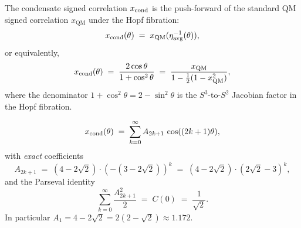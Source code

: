 \begin{theorem}
\label{P9:thm:hopf_pushforward}
The condensate signed correlation $x_{\mathrm{cond}}$ is the push-forward of the
standard QM signed correlation $x_\mathrm{QM}$ under the Hopf fibration:
\begin{equation}
  x_{\mathrm{cond}}(\theta) \;=\; x_\mathrm{QM}(\eta^{-1}_\mathrm{avg}(\theta)),
  \label{P9:eq:hopf_pushforward}
\end{equation}
or equivalently,
\begin{equation}
  x_{\mathrm{cond}}(\theta) \;=\; \frac{2\cos\theta}{1+\cos^2\theta}
  \;=\; \frac{x_\mathrm{QM}}{1 - \tfrac{1}{2}(1-x_\mathrm{QM}^2)},
  \label{P9:eq:xcond_from_xQM}
\end{equation}
where the denominator $1+\cos^2\theta = 2-\sin^2\theta$ is the
$S^3$-to-$S^2$ Jacobian factor in the Hopf fibration.
\end{theorem}

\begin{theorem}
\label{P9:thm:fourier_exact}
\begin{equation}
  x_{\mathrm{cond}}(\theta)
  \;=\; \sum_{k=0}^{\infty} A_{2k+1}\,\cos((2k+1)\theta),
  \label{P9:eq:xcond_fourier}
\end{equation}
with \emph{exact} coefficients
\begin{equation}
  \boxed{A_{2k+1}
  \;=\; (4-2\sqrt{2})\cdot(-(3-2\sqrt{2}))^k
  \;=\; (4-2\sqrt{2})\cdot(2\sqrt{2}-3)^k},
  \label{P9:eq:A_exact}
\end{equation}
and the Parseval identity
\begin{equation}
  \boxed{\sum_{k=0}^{\infty} \frac{A_{2k+1}^2}{2}
  \;=\; C(0) \;=\; \frac{1}{\sqrt{2}}}.
  \label{P9:eq:parseval_exact}
\end{equation}
In particular $A_1 = 4-2\sqrt{2} = 2(2-\sqrt{2})\approx1.172$.
\end{theorem}

